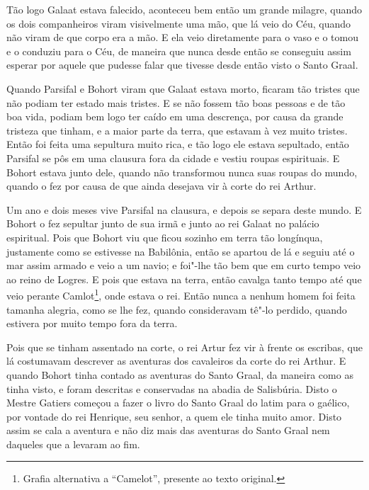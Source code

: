 Tão logo Galaat estava falecido, aconteceu bem então um grande milagre, quando
os dois companheiros viram visivelmente uma mão, que lá veio do Céu, quando não
viram de que corpo era a mão. E ela veio diretamente para o vaso e o tomou e o
conduziu para o Céu, de maneira que nunca desde então se conseguiu assim
esperar por aquele que pudesse falar que tivesse desde então visto o Santo
Graal. 

Quando Parsifal e Bohort viram que Galaat estava morto, ficaram tão tristes que
não podiam ter estado mais tristes. E se não fossem tão boas pessoas e de tão
boa vida, podiam bem logo ter caído em uma descrença, por causa da grande
tristeza que tinham, e a maior parte da terra, que estavam à vez muito tristes.
Então foi feita uma sepultura muito rica, e tão logo ele estava sepultado,
então Parsifal se pôs em uma clausura fora da cidade e vestiu roupas
espirituais. E Bohort estava junto dele, quando não transformou nunca suas
roupas do mundo, quando o fez por causa de que ainda desejava vir à corte do
rei Arthur.

Um ano e dois meses vive Parsifal na clausura, e depois se separa deste mundo.
E Bohort o fez sepultar junto de sua irmã e junto ao rei Galaat no palácio
espiritual. Pois que Bohort viu que ficou sozinho em terra tão longínqua,
justamente como se estivesse na Babilônia, então se apartou de lá e seguiu até
o mar assim armado e veio a um navio; e foi"-lhe tão bem que em curto tempo veio
ao reino de Logres. E pois que estava na terra, então cavalga tanto tempo até
que veio perante Camlot\footnote{ Grafia alternativa a “Camelot”, presente ao
texto original.},  onde estava o rei. Então nunca a nenhum homem
foi feita tamanha alegria, como se lhe fez, quando consideravam tê"-lo perdido,
quando estivera por muito tempo fora da terra.

Pois que se tinham assentado na corte, o rei Artur fez vir à frente os escribas,
que lá costumavam descrever as aventuras dos cavaleiros da corte do rei Arthur.
E quando Bohort tinha contado as aventuras do Santo Graal, da maneira como as
tinha visto, e foram descritas e conservadas na abadia de Salisbúria. Disto o
Mestre Gatiers começou a fazer o livro do Santo Graal do latim para o gaélico,
por vontade do rei Henrique, seu senhor, a quem ele tinha muito amor. Disto
assim se cala a aventura e não diz mais das aventuras do Santo Graal nem
daqueles que a levaram ao fim. 



